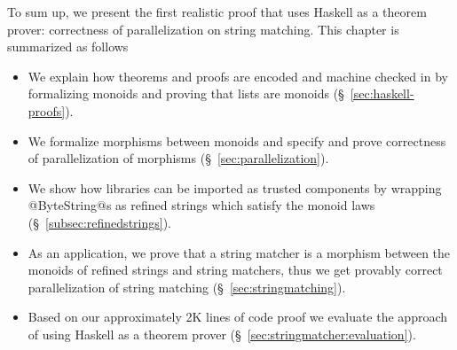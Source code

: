 To sum up, we present the first realistic proof that 
uses Haskell as a theorem prover:
correctness of parallelization on string matching.
%
This chapter is summarized as follows
\begin{itemize}
\item We explain how theorems and proofs are encoded and machine checked in \toolname
by formalizing monoids and proving that lists are monoids
(\S~\ref{sec:haskell-proofs}).
\item We formalize morphisms between monoids and
specify and prove correctness of parallelization of morphisms
(\S~\ref{sec:parallelization}).
\item We show how libraries can be imported as trusted components by wrapping
@ByteString@s as refined strings which satisfy the monoid laws (\S~\ref{subsec:refinedstrings}).
\item As an application, we prove that a string matcher is a morphism between the monoids of refined strings
and string matchers,  thus we get provably correct parallelization of string matching (\S~\ref{sec:stringmatching}).
\item Based on our approximately 2K lines of code proof we evaluate the approach of using Haskell as a theorem prover
(\S~\ref{sec:stringmatcher:evaluation}).
\end{itemize}
